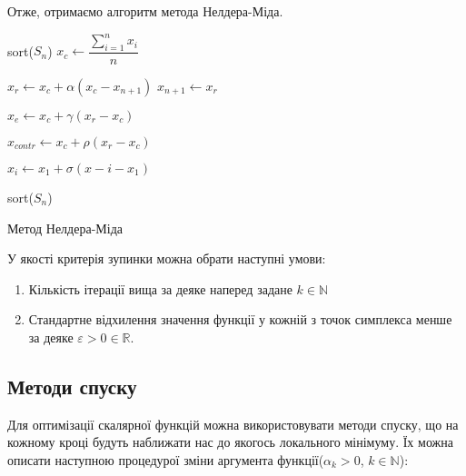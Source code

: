 Отже, отримаємо алгоритм метода Нелдера-Міда.

\begin{algorithm}[H] \label{alg:nelder_mead}
    \SetAlgoLined
    {
        sort($S_n$)\;
        $ x_c \leftarrow \dfrac{\sum\limits_{i=1}^{n} x_i}{n} $ \;

        $ x_r  \leftarrow x_c + \alpha(x_c - x_{n+1}) $ 
        {
            $x_{n+1} \leftarrow x_r$ \;
            \Continue
        }

        {
            $x_e \leftarrow x_c + \gamma (x_r - x_c)$ 
            \Continue
        }

        {
            $x_{contr} \leftarrow x_c + \rho (x_r - x_c)$ 
        }


        {
            $x_i \leftarrow x_1 + \sigma(x-i - x_1)$ 
        }
    }
    sort($S_n$)\;
    \caption{Метод Нелдера-Міда}
\end{algorithm}

\vspace*{0.5cm}
У якості критерія зупинки можна обрати наступні умови:
\begin{enumerate}
    \item Кількість ітерації вища за деяке наперед задане $k \in \mathbb{N}$
    \item Стандартне відхилення значення функції у кожній з точок
    симплекса менше за деяке $\varepsilon > 0 \in \mathbb{R}$.
\end{enumerate}

\subsection*{Методи спуску}

Для оптимізації скалярної функцій можна
використовувати методи спуску, що на кожному кроці
будуть наближати нас до якогось локального мінімуму.
Їх можна описати наступною процедурої зміни
аргумента функції($\alpha_k > 0$, $k \in \mathbb{N}$):

